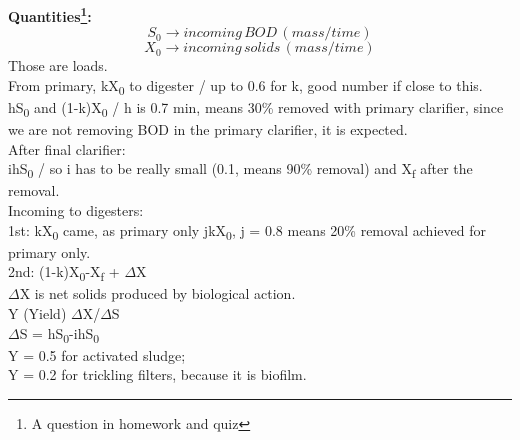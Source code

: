 \documentclass[12pt]{article}
\begin{document}
\textbf{Quantities\footnote{A question in homework and quiz}:}
\[S_0 \rightarrow incoming\,BOD\,(mass/time)\]
\[X_0 \rightarrow incoming\,solids\,(mass/time)\]
Those are loads.\\
From primary, kX\textsubscript{0} to digester / up to 0.6 for k, good number if close to this.\\
hS\textsubscript{0} and (1-k)X\textsubscript{0} / h is 0.7 min, means 30\% removed with primary clarifier, since we are not removing BOD in the primary clarifier, it is expected.\\
After final clarifier:\\
ihS\textsubscript{0} / so i has to be really small (0.1, means 90\% removal) and X\textsubscript{f} after the removal.\\
Incoming to digesters:\\
1st: kX\textsubscript{0} came, as primary only jkX\textsubscript{0}, j = 0.8 means 20\% removal achieved for primary only.\\
2nd: (1-k)X\textsubscript{0}-X\textsubscript{f} + $\Delta$X\\
$\Delta$X is net solids produced by biological action.\\
Y (Yield) $\Delta$X/$\Delta$S\\
$\Delta$S = hS\textsubscript{0}-ihS\textsubscript{0}\\
Y = 0.5 for activated sludge;\\
Y = 0.2 for trickling filters, because it is biofilm.
\end{document}

